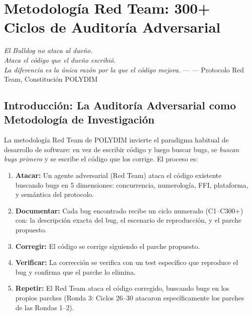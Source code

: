 \chapter{Metodología Red Team: 300+ Ciclos de Auditoría Adversarial}


\textit{El Bulldog no ataca al dueño.\\
Ataca el código que el dueño escribió.\\
La diferencia es la única razón por la que el código mejora.} --- --- Protocolo Red Team, Constitución POLYDIM

\section{Introducción: La Auditoría Adversarial como Metodología de Investigación}

La metodología Red Team de POLYDIM invierte el paradigma habitual de desarrollo de software:
en vez de escribir código y luego buscar bugs, se \textit{buscan bugs primero} y se
escribe el código que los corrige. El proceso es:

\begin{enumerate}
\item \textbf{Atacar:} Un agente adversarial (Red Team) ataca el código existente buscando
bugs en 5 dimensiones: concurrencia, numerología, FFI, plataforma, y semántica del protocolo.

\item \textbf{Documentar:} Cada bug encontrado recibe un ciclo numerado (C1--C300+) con:
la descripción exacta del bug, el escenario de reproducción, y el parche propuesto.

\item \textbf{Corregir:} El código se corrige siguiendo el parche propuesto.

\item \textbf{Verificar:} La corrección se verifica con un test específico que reproduce
el bug y confirma que el parche lo elimina.

\item \textbf{Repetir:} El Red Team ataca el código corregido, buscando bugs en los
propios parches (Ronda 3: Ciclos 26--30 atacaron específicamente los parches de las
Rondas 1--2).
\end{enumerate}

